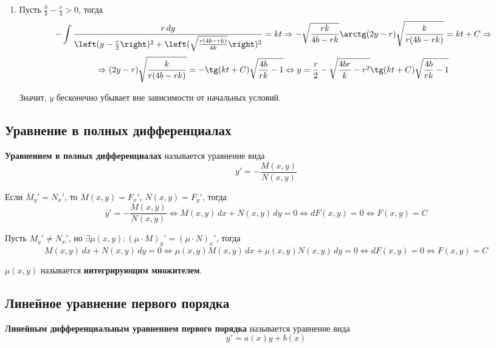 \begin{enumerate}
	\item Пусть $\frac{b}k - \frac{r}4 > 0$, тогда
	\begin{equation*}
	-\int \frac{r\,dy}{\left( y - \frac{r}2 \right)^2 + \left( \sqrt\frac{r(4b - rk)}{4k} \right)^2} = kt \Rightarrow
	-\sqrt\frac{rk}{4b - rk} \arctg (2y - r)\sqrt\frac{k}{r(4b - rk)} = kt + C \Rightarrow
	\end{equation*}
	\begin{equation*}
	\Rightarrow (2y - r)\sqrt\frac{k}{r(4b - rk)} = -\tg (kt + C) \sqrt{\frac{4b}{rk} - 1} \Leftrightarrow
	y = \frac{r}2 - \sqrt{\frac{4br}{k} - r^2}\tg (kt + C) \sqrt{\frac{4b}{rk} - 1}
	\end{equation*}
	
	Значит, $y$ бесконечно убывает вне зависимости от начальных условий.
\end{enumerate}

\subsection{Уравнение в полных дифференциалах}
 \textbf{Уравнением в полных дифференциалах} называется уравнение вида
\begin{equation*}
y' = -\frac{M(x, y)}{N(x, y)}
\end{equation*}

Если $M_y' = N_x'$, то $M(x, y) = F_x'$, $N(x, y) = F_y'$, тогда
\begin{equation*}
y' = -\frac{M(x, y)}{N(x, y)} \Leftrightarrow
M(x, y)\,dx + N(x, y)\,dy = 0 \Leftrightarrow
dF(x, y) = 0 \Leftrightarrow
F(x, y) = C
\end{equation*}

Пусть $M_y' \neq N_x'$, но $\exists \mu(x, y) \colon (\mu \cdot M)_y' = (\mu \cdot N)_x'$, тогда
\begin{equation*}
M(x, y)\,dx + N(x, y)\,dy = 0 \Leftrightarrow
\mu(x, y) M(x, y)\,dx + \mu(x, y) N(x, y)\,dy = 0 \Leftrightarrow
dF(x, y) = 0 \Leftrightarrow
F(x, y) = C
\end{equation*}

 $\mu(x, y)$ называется \textbf{интегрирующим множителем}.

\subsection{Линейное уравнение первого порядка}
 \textbf{Линейным дифференциальным уравнением первого порядка} называется уравнение вида
\begin{equation*}
y' = a(x) y + b(x)
\end{equation*}

